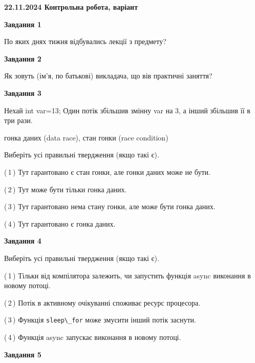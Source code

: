 \documentclass[12pt, ukrainian]{article}
\def\code#1{\Verb!#1!}
\begin{document}
\begin {large}

\textbf{22.11.2024 Контрольна робота, варіант  }\par


{

\begin{center}
\textbf{Завдання 1}
\end{center}

По яких днях тижня відбувались лекції з предмету?


\begin{center}
\textbf{Завдання 2}
\end{center}

Як зовуть (ім'я, по батькові) викладача, що вів практичні заняття?


\begin{center}
\textbf{Завдання 3}
\end{center}

Нехай int var=13; Один потік збільшив змінну var на 3, а інший збільшив її в три рази.

гонка даних (data race), стан гонки (race condition)

Виберіть усі правильні твердження (якщо такі є).\par
\vspace{2mm}
(\,1\,) Тут гарантовано є стан гонки, але гонки даних може не бути.%

(\,2\,) Тут може бути тільки гонка даних.%

(\,3\,) Тут гарантовано нема стану гонки, але може бути гонка даних.%

(\,4\,) Тут гарантовано є гонка даних.%


\begin{center}
\textbf{Завдання 4}
\end{center}

Виберіть усі правильні твердження (якщо такі є).\par
\vspace{2mm}

(\,1\,) Тільки від компілятора залежить, чи запустить функція async виконання в новому потоці.%

(\,2\,) Потік в активному очікуванні споживає ресурс процесора.%

(\,3\,) Функція \code{sleep\_for} може змусити інший потік заснути.%

(\,4\,) Функція async запускає виконання в новому потоці.%


\begin{center}
\textbf{Завдання 5}
\end{center}

}
\end{large}
\end{document}
